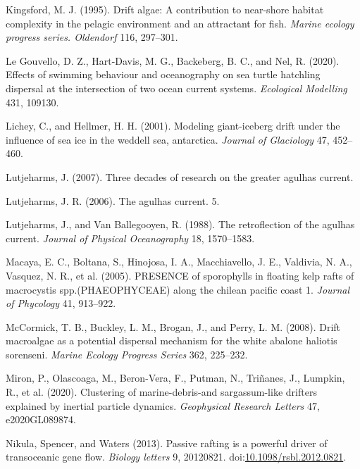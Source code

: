 \documentclass[
]{article}
\begin{document}
\leavevmode\hypertarget{ref-kingsford1995}{}%
Kingsford, M. J. (1995). Drift algae: A contribution to near-shore
habitat complexity in the pelagic environment and an attractant for
fish. \emph{Marine ecology progress series. Oldendorf} 116, 297--301.

\leavevmode\hypertarget{ref-gouvello2020}{}%
Le Gouvello, D. Z., Hart-Davis, M. G., Backeberg, B. C., and Nel, R.
(2020). Effects of swimming behaviour and oceanography on sea turtle
hatchling dispersal at the intersection of two ocean current systems.
\emph{Ecological Modelling} 431, 109130.

\leavevmode\hypertarget{ref-lichey2001}{}%
Lichey, C., and Hellmer, H. H. (2001). Modeling giant-iceberg drift
under the influence of sea ice in the weddell sea, antarctica.
\emph{Journal of Glaciology} 47, 452--460.

\leavevmode\hypertarget{ref-lutjeharms2007}{}%
Lutjeharms, J. (2007). Three decades of research on the greater agulhas
current.

\leavevmode\hypertarget{ref-lutjeharms2006}{}%
Lutjeharms, J. R. (2006). The agulhas current. 5.

\leavevmode\hypertarget{ref-lutjeharms1988}{}%
Lutjeharms, J., and Van Ballegooyen, R. (1988). The retroflection of the
agulhas current. \emph{Journal of Physical Oceanography} 18, 1570--1583.

\leavevmode\hypertarget{ref-macaya2005}{}%
Macaya, E. C., Boltana, S., Hinojosa, I. A., Macchiavello, J. E.,
Valdivia, N. A., Vasquez, N. R., et al. (2005). PRESENCE of sporophylls
in floating kelp rafts of macrocystis spp.(PHAEOPHYCEAE) along the
chilean pacific coast 1. \emph{Journal of Phycology} 41, 913--922.

\leavevmode\hypertarget{ref-McCormick2008}{}%
McCormick, T. B., Buckley, L. M., Brogan, J., and Perry, L. M. (2008).
Drift macroalgae as a potential dispersal mechanism for the white
abalone haliotis sorenseni. \emph{Marine Ecology Progress Series} 362,
225--232.

\leavevmode\hypertarget{ref-miron2020}{}%
Miron, P., Olascoaga, M., Beron-Vera, F., Putman, N., Triñanes, J.,
Lumpkin, R., et al. (2020). Clustering of marine-debris-and
sargassum-like drifters explained by inertial particle dynamics.
\emph{Geophysical Research Letters} 47, e2020GL089874.

\leavevmode\hypertarget{ref-nikula2013}{}%
Nikula, Spencer, and Waters (2013). Passive rafting is a powerful driver
of transoceanic gene flow. \emph{Biology letters} 9, 20120821.
doi:\href{https://doi.org/10.1098/rsbl.2012.0821}{10.1098/rsbl.2012.0821}.
\end{document}
